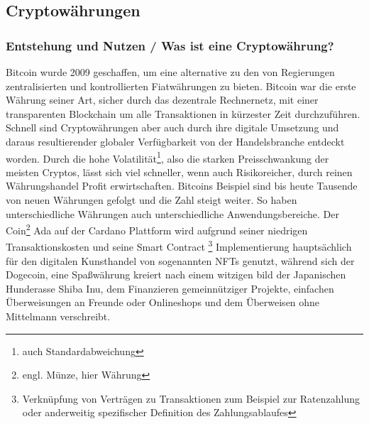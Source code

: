 \documentclass[12pt]{article}
\begin{document}
\subsection{Cryptowährungen}
	\subsubsection{Entstehung und Nutzen / Was ist eine Cryptowährung?}
		Bitcoin wurde 2009 geschaffen, um eine alternative zu den von Regierungen zentralisierten und kontrollierten Fiatwährungen zu bieten. Bitcoin war die erste Währung seiner Art, sicher durch das dezentrale Rechnernetz, mit einer transparenten Blockchain um alle Transaktionen in kürzester Zeit durchzuführen. Schnell sind Cryptowährungen aber auch durch ihre digitale Umsetzung und daraus resultierender globaler Verfügbarkeit von der Handelsbranche entdeckt worden. Durch die hohe Volatilität\footnote{auch Standardabweichung}, also die starken Preisschwankung der meisten Cryptos, lässt sich viel schneller, wenn auch Risikoreicher, durch reinen Währungshandel Profit erwirtschaften. Bitcoins Beispiel sind bis heute Tausende von neuen Währungen gefolgt und die Zahl steigt weiter. So haben unterschiedliche Währungen auch unterschiedliche Anwendungsbereiche. Der Coin\footnote{engl. Münze, hier Währung} Ada auf der Cardano Plattform wird aufgrund seiner niedrigen Transaktionskosten und seine Smart Contract \footnote{Verknüpfung von Verträgen zu Transaktionen zum Beispiel zur Ratenzahlung oder anderweitig spezifischer Definition des Zahlungsablaufes} Implementierung hauptsächlich für den digitalen Kunsthandel von sogenannten NFTs genutzt, während sich der Dogecoin, eine Spaßwährung kreiert nach einem witzigen bild der Japanischen Hunderasse Shiba Inu, dem Finanzieren gemeinnütziger Projekte, einfachen Überweisungen an Freunde oder Onlineshops und dem Überweisen ohne Mittelmann verschreibt.
\end{document}
